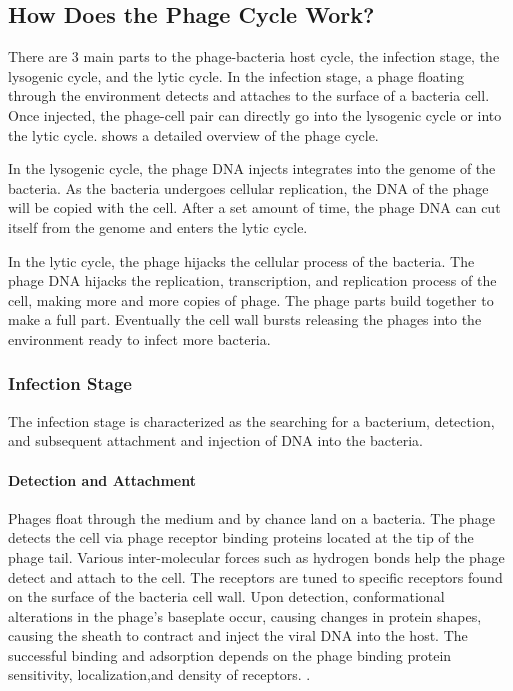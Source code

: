 \subsection{How Does the Phage Cycle Work?}
There are 3 main parts to the phage-bacteria host cycle, the infection stage, the lysogenic cycle, and the lytic cycle. 
In the infection stage, a phage floating through the environment detects and attaches to the surface of a bacteria cell. 
Once injected, the phage-cell pair can directly go into the lysogenic cycle or into the lytic cycle. 
 shows a detailed overview of the phage cycle. 
\newline 

In the lysogenic cycle, the phage DNA injects integrates into the genome of the bacteria. 
As the bacteria undergoes cellular replication, the DNA of the phage will be copied with the cell. 
After a set amount of time, the phage DNA can cut itself from the genome and enters the lytic cycle.
\newline 

In the lytic cycle, the phage hijacks the cellular process of the bacteria. 
The phage DNA hijacks the replication, transcription, and replication process of the cell, making more and more copies of phage. 
The phage parts build together to make a full part. 
Eventually the cell wall bursts releasing the phages into the environment ready to infect more bacteria. 

\subsubsection{Infection Stage}
The infection stage is characterized as the searching for a bacterium, detection, and subsequent attachment and injection of DNA into the bacteria. 
\paragraph{Detection and Attachment}
Phages float through the medium and by chance land on a bacteria. The phage detects the cell via phage receptor binding proteins located at the tip of the phage tail. 
Various inter-molecular forces such as hydrogen bonds help the phage detect and attach to the cell. 
The receptors are tuned to specific receptors found on the surface of the bacteria cell wall. 
Upon detection, conformational alterations in the phage's baseplate occur, causing changes in protein shapes, causing the sheath to contract and inject the viral DNA into the host. 
The successful binding and adsorption depends on the phage binding protein sensitivity, localization,and density of receptors. \cite{stoneUnderstandingExploitingPhage2019}. 

